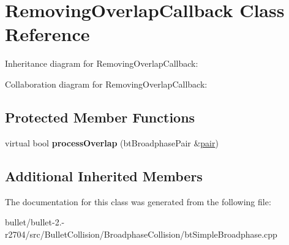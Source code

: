 \hypertarget{class_removing_overlap_callback}{\section{Removing\+Overlap\+Callback Class Reference}
\label{class_removing_overlap_callback}
}


Inheritance diagram for Removing\+Overlap\+Callback\+:


Collaboration diagram for Removing\+Overlap\+Callback\+:
\subsection*{Protected Member Functions}
\begin{DoxyCompactItemize}
\item 
\hypertarget{class_removing_overlap_callback_aca04ec1cf011025cdf948610f5f95239}{virtual bool {\bfseries process\+Overlap} (bt\+Broadphase\+Pair \&\hyperlink{structpair}{pair})}\label{class_removing_overlap_callback_aca04ec1cf011025cdf948610f5f95239}

\end{DoxyCompactItemize}
\subsection*{Additional Inherited Members}


The documentation for this class was generated from the following file\+:\begin{DoxyCompactItemize}
\item 
bullet/bullet-\/2.-\/r2704/src/\+Bullet\+Collision/\+Broadphase\+Collision/bt\+Simple\+Broadphase.\+cpp\end{DoxyCompactItemize}
